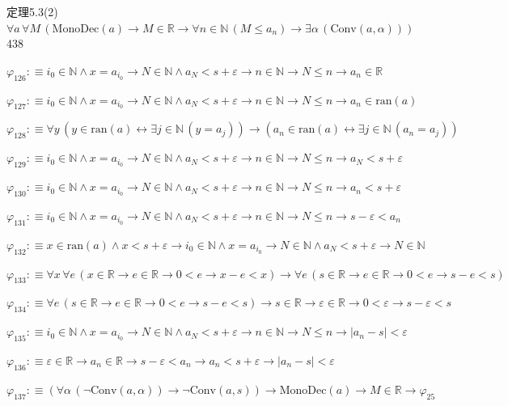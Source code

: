 \begin{fullproof}{定理5.3(2)}{$\forall a\,\forall M\,(\mathrm{MonoDec}(a) \to M \in \mathbb{R} \to \forall n \in \mathbb{N}\,(M \leq a_{n}) \to \exists \alpha\,(\mathrm{Conv}(a,\alpha)))$}{438}
\begin{abbrevlist}
\item $\varphi_{126} :\equiv i_{0} \in \mathbb{N} \land x = a_{i_{0}} \to N \in \mathbb{N} \land a_{N} < s + \varepsilon \to n \in \mathbb{N} \to N \leq n \to a_{n} \in \mathbb{R}$
\item $\varphi_{127} :\equiv i_{0} \in \mathbb{N} \land x = a_{i_{0}} \to N \in \mathbb{N} \land a_{N} < s + \varepsilon \to n \in \mathbb{N} \to N \leq n \to a_{n} \in \mathrm{ran}(a)$
\item $\varphi_{128} :\equiv \forall y\,(y \in \mathrm{ran}(a) \leftrightarrow \exists j \in \mathbb{N}\,(y = a_{j})) \to (a_{n} \in \mathrm{ran}(a) \leftrightarrow \exists j \in \mathbb{N}\,(a_{n} = a_{j}))$
\item $\varphi_{129} :\equiv i_{0} \in \mathbb{N} \land x = a_{i_{0}} \to N \in \mathbb{N} \land a_{N} < s + \varepsilon \to n \in \mathbb{N} \to N \leq n \to a_{N} < s + \varepsilon$
\item $\varphi_{130} :\equiv i_{0} \in \mathbb{N} \land x = a_{i_{0}} \to N \in \mathbb{N} \land a_{N} < s + \varepsilon \to n \in \mathbb{N} \to N \leq n \to a_{n} < s + \varepsilon$
\item $\varphi_{131} :\equiv i_{0} \in \mathbb{N} \land x = a_{i_{0}} \to N \in \mathbb{N} \land a_{N} < s + \varepsilon \to n \in \mathbb{N} \to N \leq n \to s - \varepsilon < a_{n}$
\item $\varphi_{132} :\equiv x \in \mathrm{ran}(a) \land x < s + \varepsilon \to i_{0} \in \mathbb{N} \land x = a_{i_{0}} \to N \in \mathbb{N} \land a_{N} < s + \varepsilon \to N \in \mathbb{N}$
\item $\varphi_{133} :\equiv \forall x\,\forall e\,(x \in \mathbb{R} \to e \in \mathbb{R} \to 0 < e \to x - e < x) \to \forall e\,(s \in \mathbb{R} \to e \in \mathbb{R} \to 0 < e \to s - e < s)$
\item $\varphi_{134} :\equiv \forall e\,(s \in \mathbb{R} \to e \in \mathbb{R} \to 0 < e \to s - e < s) \to s \in \mathbb{R} \to \varepsilon \in \mathbb{R} \to 0 < \varepsilon \to s - \varepsilon < s$
\item $\varphi_{135} :\equiv i_{0} \in \mathbb{N} \land x = a_{i_{0}} \to N \in \mathbb{N} \land a_{N} < s + \varepsilon \to n \in \mathbb{N} \to N \leq n \to \lvert a_{n} - s \rvert < \varepsilon$
\item $\varphi_{136} :\equiv \varepsilon \in \mathbb{R} \to a_{n} \in \mathbb{R} \to s - \varepsilon < a_{n} \to a_{n} < s + \varepsilon \to \lvert a_{n} - s \rvert < \varepsilon$
\item $\varphi_{137} :\equiv (\forall \alpha\,(\neg \mathrm{Conv}(a,\alpha)) \to \neg \mathrm{Conv}(a,s)) \to \mathrm{MonoDec}(a) \to M \in \mathbb{R} \to \varphi_{25}$

\end{abbrevlist}
\end{fullproof}

